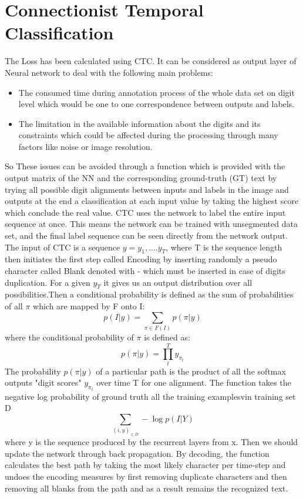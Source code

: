 \section{Connectionist Temporal Classification}\label{sec:ctc}

The Loss has been calculated using CTC. It can be considered as output layer of Neural network to deal with the following main problems:
\begin{itemize}
\item The consumed time during annotation process of the whole data set on digit level which would be one to one correspondence between outputs and labels.
\item The limitation in the available information about the digits and its constraints which could be affected during the processing through many factors like noise or image resolution.
\end{itemize}
So These issues can be avoided through a function which is provided with the output matrix of the NN and the corresponding ground-truth (GT) text by trying all possible digit alignments between inputs and labels in the image and outputs at the end a classification at each input value by taking the highest score which conclude the real value. CTC uses the network to label the entire input sequence at once. This means the network can be trained with unsegmented data set, and the final label sequence can be seen directly from the network output. The input of CTC is a sequence $y=y_{1},....y_{T}$, where T is the sequence length then initiates the first step called Encoding by inserting randomly a pseudo character called Blank denoted with {-} which must be inserted in case of digits duplication. For a given $y_{T}$ it gives us an output distribution over all possibilities.Then a conditional probability is defined as the sum of probabilities of all $\pi$ which are mapped by F onto I:
\begin{equation}
p( I | y)=\sum_{\pi \in F(I)} p( \pi | y )
\label{eq3}
\end{equation}
where the conditional probability of $\pi$ is defined as: 
\begin{equation}
p( \pi | y ) =\prod_t^T y_{\pi_{t}}
\label{eq3}
\end{equation}
The probability $p( \pi | y )$ of a particular path is the product of all the softmax outputs "digit scores" $y_{\pi_{t}}$ over time T for one alignment. The function takes the negative log probability of ground truth all the training examplesvin training set D
\begin{equation}
\sum_{(i,y)_{\in D}} - \log  p( I | Y )
\label{eq3}
\end{equation}
where y is the sequence produced by the recurrent layers from x. Then we should update the network through back propagation. By decoding, the function calculates the best path by taking the most likely character per time-step and undoes the encoding measures by first removing duplicate characters and then removing all blanks from the path and as a result remains the recognized text.

